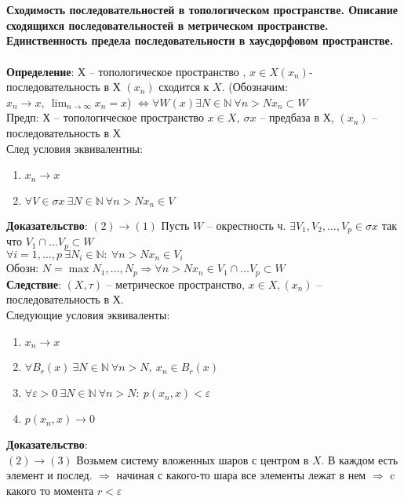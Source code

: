 \section{}
	\textbf{Сходимость последовательностей в топологическом пространстве. Описание сходящихся последовательностей в метрическом пространстве. Единственность предела последовательности в хаусдорфовом пространстве.}\\
	\\
	\textbf{Определение}: Х -- топологическое пространство , $x\in X (x_n)$- последовательность в Х $(x_n)$ сходится к $X$. (Обозначим: $x_n \rightarrow x,\ \lim_{n\rightarrow \infty} x_n=x$) $\Leftrightarrow \forall W(x) \exists N \in \mathbb{N}\ \forall n>N x_n \subset W$\\
	Предп: Х -- топологическое пространство $x\in X,\ \sigma x$ -- предбаза в Х, $(x_n)$ -- последовательность в Х\\
	След условия эквивалентны:
	\begin{enumerate}
		\item $x_n \rightarrow x$
		\item $\forall V \in \sigma x\ \exists N \in \mathbb{N}\ \forall n > N x_n \in V$
	\end{enumerate}
	\textbf{Доказательство}: $(2) \rightarrow (1)$ Пусть $W$ -- окрестность ч. $\exists V_1, V_2, \ldots, V_p \in \sigma x$ так что $V_1 \cap \ldots V_p \subset W$\\ 
	$\forall i=1,\ldots, p\ \exists N_i \in \mathbb{N}:\ \forall n > N x_n \in V_i$\\
	Обозн: $N = \max{N_1, \ldots , N_p} \Rightarrow \forall n > N x_n \in V_1 \cap \ldots V_p \subset W$\\
	\textbf{Следствие}: $(X, \tau)$ -- метрическое пространство, $x \in X, (x_n)$ -- последовательность в Х.\\
	Следующие условия эквиваленты:
	\begin{enumerate}
		\item $x_n \rightarrow x$
		\item $\forall B_r(x)\ \exists N \in \mathbb{N}\ \forall n>N,\ x_n \in B_r(x)$ 
		\item $\forall \varepsilon >0\ \exists N \in \mathbb{N}\ \forall n > N:\ p(x_n, x) < \varepsilon$
		\item $p(x_n, x) \rightarrow 0$
	\end{enumerate}
	\textbf{Доказательство}: \\
	$(2) \rightarrow (3)$ Возьмем систему вложенных шаров с центром в $X$. В каждом есть элемент и послед. $\Rightarrow$ начиная с какого-то шара все элементы лежат в нем $\Rightarrow$ c какого то момента $r < \varepsilon$\\
